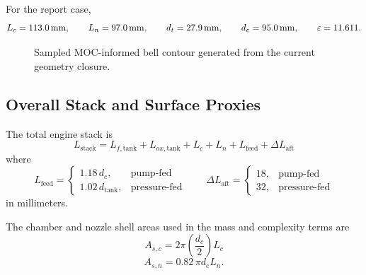 \documentclass[11pt]{article}
\begin{document}
For the report case,
\[
L_c=\SI{113.0}{mm}, \qquad
L_n=\SI{97.0}{mm}, \qquad
d_t=\SI{27.9}{mm}, \qquad
d_e=\SI{95.0}{mm}, \qquad
\varepsilon=11.611.
\]

\begin{figure}[H]
\centering
{}
\caption{Sampled MOC-informed bell contour generated from the current geometry closure.}
\end{figure}

\subsection{Overall Stack and Surface Proxies}
The total engine stack is
\begin{equation}
L_{\text{stack}}
=
L_{f,\text{tank}}
+L_{ox,\text{tank}}
+L_c
+L_n
+L_{\text{feed}}
+\Delta L_{\text{aft}}
\label{eq:stack-length}
\end{equation}
where
\begin{equation}
L_{\text{feed}}=
\begin{cases}
1.18\,d_c, & \text{pump-fed}\\
1.02\,d_{\text{tank}}, & \text{pressure-fed}
\end{cases}
\qquad
\Delta L_{\text{aft}}=
\begin{cases}
18, & \text{pump-fed}\\
32, & \text{pressure-fed}
\end{cases}
\label{eq:feed-bay}
\end{equation}
in millimeters.

The chamber and nozzle shell areas used in the mass and complexity terms are
\begin{equation}
A_{s,c}=2\pi \left(\frac{d_c}{2}\right)L_c
\label{eq:chamber-area}
\end{equation}
\begin{equation}
A_{s,n}=0.82\,\pi d_e L_n.
\label{eq:nozzle-shell-area}
\end{equation}
\end{document}
